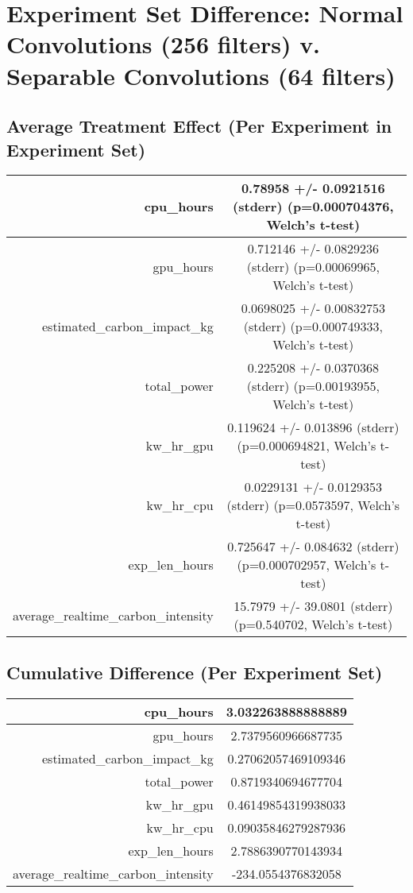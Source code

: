 \documentclass{article}%
\begin{document}
%
\normalsize%
\section{Experiment Set Difference: Normal Convolutions (256 filters) v. Separable Convolutions (64 filters)}%
\label{sec:Experiment Set Difference Normal Convolutions (256 filters) v. Separable Convolutions (64 filters)}%
\subsection{Average Treatment Effect (Per Experiment in Experiment Set)}%
\label{subsec:Average Treatment Effect (Per Experiment in Experiment Set)}%
\begin{tabular}{|r|c|}%
\hline%
cpu\_hours&0.78958 +/{-} 0.0921516 (stderr) (p=0.000704376, Welch's t{-}test)\\%
\hline%
gpu\_hours&0.712146 +/{-} 0.0829236 (stderr) (p=0.00069965, Welch's t{-}test)\\%
\hline%
estimated\_carbon\_impact\_kg&0.0698025 +/{-} 0.00832753 (stderr) (p=0.000749333, Welch's t{-}test)\\%
\hline%
total\_power&0.225208 +/{-} 0.0370368 (stderr) (p=0.00193955, Welch's t{-}test)\\%
\hline%
kw\_hr\_gpu&0.119624 +/{-} 0.013896 (stderr) (p=0.000694821, Welch's t{-}test)\\%
\hline%
kw\_hr\_cpu&0.0229131 +/{-} 0.0129353 (stderr) (p=0.0573597, Welch's t{-}test)\\%
\hline%
exp\_len\_hours&0.725647 +/{-} 0.084632 (stderr) (p=0.000702957, Welch's t{-}test)\\%
\hline%
average\_realtime\_carbon\_intensity&15.7979 +/{-} 39.0801 (stderr) (p=0.540702, Welch's t{-}test)\\%
\hline%
\end{tabular}

%
\subsection{Cumulative Difference (Per Experiment Set)}%
\label{subsec:Cumulative Difference (Per Experiment Set)}%
\begin{tabular}{|r|c|}%
\hline%
cpu\_hours&3.032263888888889\\%
\hline%
gpu\_hours&2.7379560966687735\\%
\hline%
estimated\_carbon\_impact\_kg&0.27062057469109346\\%
\hline%
total\_power&0.8719340694677704\\%
\hline%
kw\_hr\_gpu&0.46149854319938033\\%
\hline%
kw\_hr\_cpu&0.09035846279287936\\%
\hline%
exp\_len\_hours&2.7886390770143934\\%
\hline%
average\_realtime\_carbon\_intensity&{-}234.0554376832058\\%
\hline%
\end{tabular}

%
\end{document}
